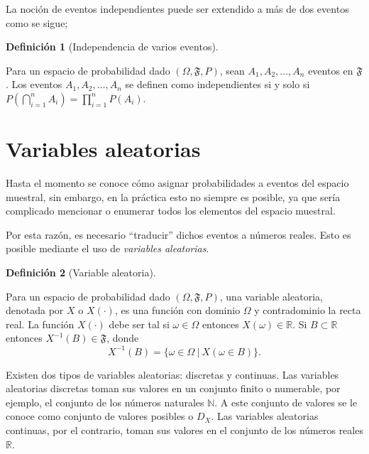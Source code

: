 \documentclass[
  us-letterpaper,
]{scrreprt}
\theoremstyle{plain}
\theoremstyle{definition}
\newtheorem{definition}{Definición}[chapter]
\theoremstyle{definition}
\theoremstyle{plain}
\theoremstyle{remark}
\begin{document}
La noción de eventos independientes puede ser extendido a más de dos
eventos como se sigue;

\begin{definition}[Independencia de varios
eventos]\protect\hypertarget{def-ive}{}\label{def-ive}

Para un espacio de probabilidad dado \((\Omega, \mathfrak{F}, P)\), sean
\(A_1, A_2, \ldots, A_n\) eventos en \(\mathfrak{F}\). Los eventos
\(A_1, A_2, \ldots, A_n\) se definen como independientes si y solo si
\(P\left(\bigcap\limits_{i=1}^n A_i\right)=\prod\limits_{i=1}^n P(A_i)\).

\end{definition}

\section{Variables aleatorias}\label{variables-aleatorias}

Hasta el momento se conoce cómo asignar probabilidades a eventos del
espacio muestral, sin embargo, en la práctica esto no siempre es
posible, ya que sería complicado mencionar o enumerar todos los
elementos del espacio muestral.

Por esta razón, es necesario ``traducir'' dichos eventos a números
reales. Esto es posible mediante el uso de \emph{variables aleatorias}.

\begin{definition}[Variable
aleatoria]\protect\hypertarget{def-va}{}\label{def-va}

Para un espacio de probabilidad dado \((\Omega, \mathfrak{F}, P)\), una
variable aleatoria, denotada por \(X\) o \(X(\cdot)\), es una función
con dominio \(\Omega\) y contradominio la recta real. La función
\(X(\cdot)\) debe ser tal si \(\omega\in\Omega\) entonces
\(X(\omega)\in\mathbb R\). Si \(B\subset \mathbb R\) entonces
\(X^{-1}(B)\in\mathfrak{F}\), donde
\[X^{-1}(B)=\{\omega\in\Omega\ |\  X(\omega\in B)\}.\]

\end{definition}

Existen dos tipos de variables aleatorias: discretas y continuas. Las
variables aleatorias discretas toman sus valores en un conjunto finito o
numerable, por ejemplo, el conjunto de los números naturales
\(\mathbb N\). A este conjunto de valores se le conoce como conjunto de
valores posibles o \(D_X\). Las variables aleatorias continuas, por el
contrario, toman sus valores en el conjunto de los números reales
\(\mathbb R\).
\end{document}
